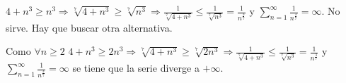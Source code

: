 \begin{example}
\begin{itemize}
		      \(4 + n^{3} \geq n^{3} \Rightarrow \sqrt[7]{4 + n^{3} } \geq \sqrt[7]{n^{3} } \Rightarrow \frac{1}{\sqrt[7]{4 + n^{3} } } \leq \frac{1}{\sqrt[7]{n^{3} } } = \frac{1}{n^{\frac{3}{7}} }\) y \(\sum_{n =1}^{\infty} \frac{1}{n^{\frac{3}{7}}  } = \infty\). No sirve. Hay que buscar otra alternativa.

		      Como \(\forall n \geq  2\) \(4 + n^{3} \geq 2n^{3} \Rightarrow \sqrt[7]{4 + n^{3} } \geq \sqrt[7]{2n^{3} } \Rightarrow \frac{1}{\sqrt[7]{4 + n^{3} } } \leq \frac{1}{\sqrt[7]{n^{3} } } = \frac{1}{n^{\frac{3}{7}} }\) y \(\sum_{n =1}^{\infty} \frac{1}{n^{\frac{3}{7}}  } = \infty\) se tiene que la serie diverge a \(+\infty \).


	\end{itemize}
\end{example}

